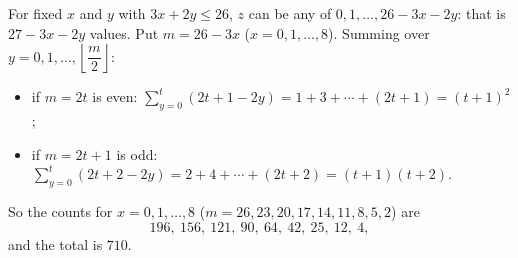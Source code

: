 For fixed $x$ and $y$ with $3x+2y\le26$, $z$ can be any of $0,1,\dots,26-3x-2y$: that is $27-3x-2y$ values. Put $m=26-3x$ ($x=0,1,\dots,8$). Summing over $y=0,1,\dots,\left\lfloor\dfrac m2\right\rfloor$:
\begin{itemize}
\item if $m=2t$ is even: $\displaystyle\sum_{y=0}^{t}(2t+1-2y)=1+3+\cdots+(2t+1)=(t+1)^2$;
\item if $m=2t+1$ is odd: $\displaystyle\sum_{y=0}^{t}(2t+2-2y)=2+4+\cdots+(2t+2)=(t+1)(t+2)$.
\end{itemize}
So the counts for $x=0,1,\dots,8$ ($m=26,23,20,17,14,11,8,5,2$) are
\[196,\ 156,\ 121,\ 90,\ 64,\ 42,\ 25,\ 12,\ 4,\]
and the total is $\boxed{710}$.
